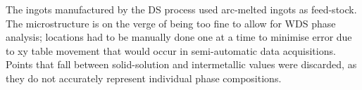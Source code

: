 The ingots manufactured by the DS process used arc-melted ingots as feed-stock.  The microstructure is on the verge of being too fine to allow for WDS phase analysis; locations had to be manually done one at a time to minimise error due to xy table movement that would occur in semi-automatic data acquisitions.  Points that fall between solid-solution and intermetallic values were discarded, as they do not accurately represent individual phase compositions.    


%
%
%
%
%
%
%
